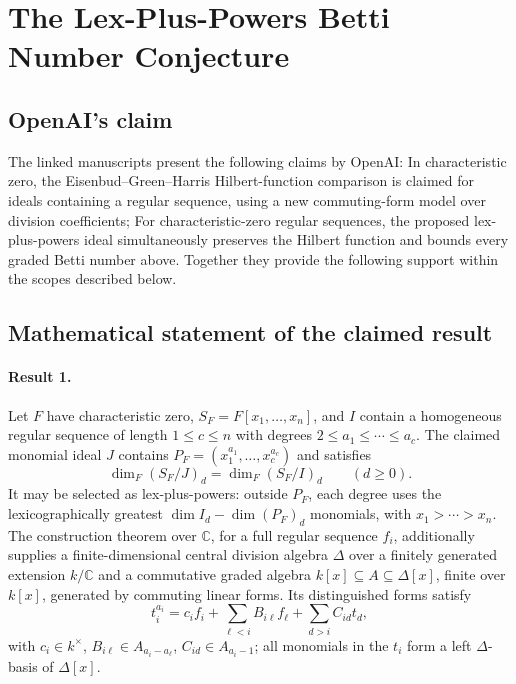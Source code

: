 \documentclass[11pt]{article}
\begin{document}
\section*{The Lex-Plus-Powers Betti Number Conjecture}

\subsection{OpenAI's claim}
The linked manuscripts present the following claims by OpenAI: In characteristic zero, the Eisenbud--Green--Harris Hilbert-function comparison is claimed for ideals containing a regular sequence, using a new commuting-form model over division coefficients; For characteristic-zero regular sequences, the proposed lex-plus-powers ideal simultaneously preserves the Hilbert function and bounds every graded Betti number above. Together they provide the following support within the scopes described below.

\subsection{Mathematical statement of the claimed result}
\paragraph{Result 1.} Let \(F\) have characteristic zero, \(S_F=F[x_1,\ldots,x_n]\), and \(I\) contain a homogeneous regular sequence of length \(1\le c\le n\) with degrees \(2\le a_1\le\cdots\le a_c\). The claimed monomial ideal \(J\) contains \(P_F=(x_1^{a_1},\ldots,x_c^{a_c})\) and satisfies
\[
 \dim_F(S_F/J)_d=\dim_F(S_F/I)_d\qquad(d\ge0).
\]
It may be selected as lex-plus-powers: outside \(P_F\), each degree uses the lexicographically greatest \(\dim I_d-\dim(P_F)_d\) monomials, with \(x_1>\cdots>x_n\). The construction theorem over \(\mathbb C\), for a full regular sequence \(f_i\), additionally supplies a finite-dimensional central division algebra \(\Delta\) over a finitely generated extension \(k/\mathbb C\) and a commutative graded algebra \(k[x]\subseteq A\subseteq\Delta[x]\), finite over \(k[x]\), generated by commuting linear forms. Its distinguished forms satisfy
\[
 t_i^{a_i}=c_if_i+\sum_{\ell<i}B_{i\ell}f_\ell+\sum_{d>i}C_{id}t_d,
\]
with \(c_i\in k^\times\), \(B_{i\ell}\in A_{a_i-a_\ell}\), \(C_{id}\in A_{a_i-1}\); all monomials in the \(t_i\) form a left \(\Delta\)-basis of \(\Delta[x]\).
\end{document}
